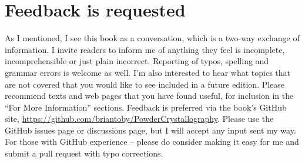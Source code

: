 \section*{Feedback is requested}

As I mentioned, I see this book as a conversation, which is a two-way exchange of information. I invite readers to inform me of anything they feel is incomplete, incomprehensible or just plain incorrect. 
Reporting of typos, spelling and grammar errors is welcome as well. I’m also interested to hear what topics that are not covered that you would like to see included in a future edition. 
Please recommend texts and web pages that you have found useful, for inclusion in the ``For More Information'' sections.
Feedback is preferred via the book's GitHub site, \url{https://github.com/briantoby/PowderCrystallography}. Please use the GitHub issues page or discussions page, but I will accept any input sent my way. 
For those with GitHub experience – please do consider making it easy for me and submit a pull request with typo corrections.

